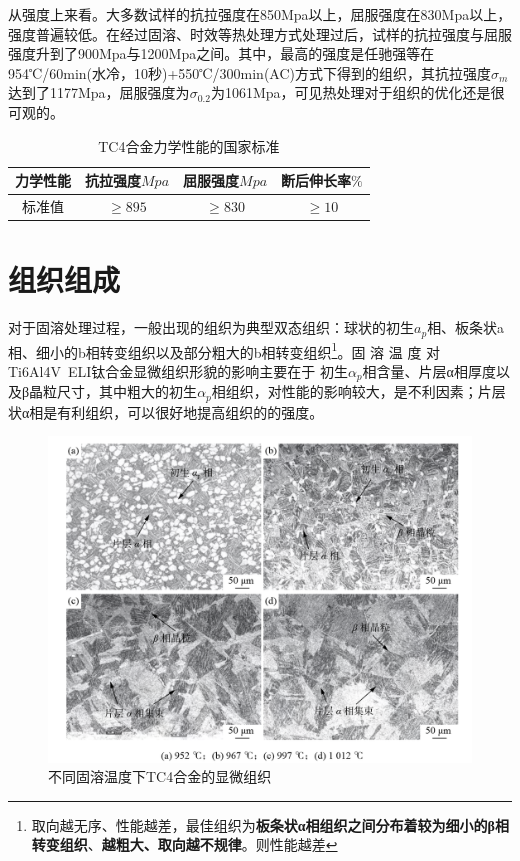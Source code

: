 \documentclass[
class = book,
zihao = -4,
font = noto,
paper = a4paper,
openany
]{easybook}
\begin{document}
从强度上来看。大多数试样的抗拉强度在850Mpa以上，屈服强度在830Mpa以上，强度普遍较低。在经过固溶、时效等热处理方式处理过后，试样的抗拉强度与屈服强度升到了900Mpa与1200Mpa之间。其中，最高的强度是任驰强等\cite{renchiqiangGurongshixiaoduiTC4taihejinxianweizuzhihelixuexingnengdeyingxiang2022}在954℃/60min(水冷，10秒)+550℃/300min(AC)方式下得到的组织，其抗拉强度$ \sigma_m $达到了1177Mpa，屈服强度为$ \sigma_{0.2} $为1061Mpa，可见热处理对于组织的优化还是很可观的。
\begin{table}[htbp]
	\centering
	\label{sec:mytc4machin}
	\caption{TC4合金力学性能的国家标准}
	\begin{tabular}{cccc}
		\toprule
		力学性能& 抗拉强度$Mpa  $& 屈服强度$ Mpa $&断后伸长率$ \% $\\ \midrule
		标准值 &$ \ge 895 $&$ \ge 830 $&$ \ge 10 $ \\ \bottomrule
	\end{tabular}
\end{table}




\section{组织组成}
对于固溶处理过程，一般出现的组织为典型双态组织：球状的初生$ a_p $相、板条状a相、细小的b相转变组织以及部分粗大的b相转变组织\footnote{取向越无序、性能越差，最佳组织为\textbf{板条状α相组织之间分布着较为细小的β相转变组织}、\textbf{越粗大、取向越不规律}。则性能越差}。\cite{zhanghaoyinGurongShixiaoduiTC4taihejinzuzhihelixuexingnengdeyingxiang2014}固 溶 温 度 对 Ti6Al4V ELI钛合金显微组织形貌的影响主要在于 初生$ α_p $相含量、片层α相厚度以及β晶粒尺寸，其中粗大的初生$ α_p $相组织，对性能的影响较大，是不利因素；片层状α相是有利组织，可以很好地提高组织的的强度\cite{ranxingGurongwenduduiTi6Al4VELItaihejinxianweizuzhijixingnengdeyingxiang2021}。


\begin{figure}[h!]
	\centering
	\includegraphics[width=0.7\linewidth]{金相_丙}
	\caption{不同固溶温度下TC4合金的显微组织}
	\label{fig:}
\end{figure}
\end{document}
